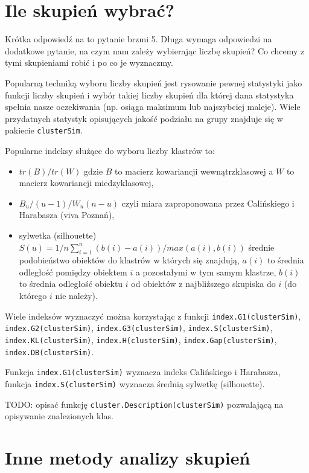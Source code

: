 \documentclass[polish,]{book}
\begin{document}
\hypertarget{part_34}{%
\section{Ile skupień wybrać?}\label{part_34}}

Krótka odpowiedź na to pytanie brzmi 5. Długa wymaga odpowiedzi na dodatkowe
pytanie, na czym nam zależy wybierając liczbę skupień? Co chcemy z tymi skupieniami robić i po co je wyznaczmy.

Popularną techniką wyboru liczby skupień jest rysowanie pewnej statystyki jako
funkcji liczby skupień i wybór takiej liczby skupień dla której dana statystyka spełnia
nasze oczekiwania (np. osiąga maksimum lub najszybciej maleje). Wiele przydatnych
statystyk opisujących jakość podziału na grupy znajduje się w pakiecie \texttt{clusterSim}.

Popularne indeksy służące do wyboru liczby klastrów to:

\begin{itemize}
\item
  \(tr(B)/tr(W)\) gdzie \(B\) to macierz kowariancji wewnątrzklasowej a \(W\) to macierz
  kowariancji miedzyklasowej,
\item
  \(B_u/(u-1)/W_u(n-u)\) czyli miara zaproponowana przez Calińskiego i Harabasza (viva Poznań),
\item
  sylwetka (silhouette) \(S(u)=1/n\sum_{i=1}^{n}(b(i)-a(i))/max(a(i),b(i))\) średnie podobieństwo obiektów do klastrów w których się znajdują, \(a(i)\) to średnia odległość pomiędzy obiektem \(i\) a pozostałymi w tym samym klastrze, \(b(i)\) to średnia odległość obiektu \(i\) od obiektów z najbliższego skupiska do \(i\) (do którego \(i\) nie należy).
\end{itemize}

Wiele indeksów wyznaczyć można korzystając z funkcji \texttt{index.G1(clusterSim)},
\texttt{index.G2(clusterSim)}, \texttt{index.G3(clusterSim)}, \texttt{index.S(clusterSim)}, \texttt{index.KL(clusterSim)},
\texttt{index.H(clusterSim)}, \texttt{index.Gap(clusterSim)}, \texttt{index.DB(clusterSim)}.

Funkcja \texttt{index.G1(clusterSim)} wyznacza indeks Calińskiego i Harabasza, funkcja \texttt{index.S(clusterSim)} wyznacza średnią sylwetkę (silhouette).

TODO: opisać funkcję \texttt{cluster.Description(clusterSim)} pozwalającą na opisywanie znalezionych klas.

\hypertarget{part_35}{%
\section{Inne metody analizy skupień}\label{part_35}}
\end{document}
